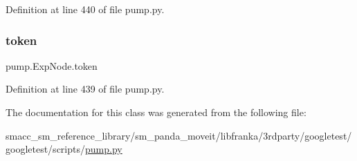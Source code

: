 Definition at line 440 of file pump.\+py.

\mbox{\label{classpump_1_1ExpNode_ade05a5a32535d717dc5c194569aaf356}} 
\subsubsection{\texorpdfstring{token}{token}}
{\footnotesize\ttfamily pump.\+Exp\+Node.\+token}



Definition at line 439 of file pump.\+py.



The documentation for this class was generated from the following file\+:\begin{DoxyCompactItemize}
\item 
smacc\+\_\+sm\+\_\+reference\+\_\+library/sm\+\_\+panda\+\_\+moveit/libfranka/3rdparty/googletest/googletest/scripts/\hyperlink{pump_8py}{pump.\+py}\end{DoxyCompactItemize}
